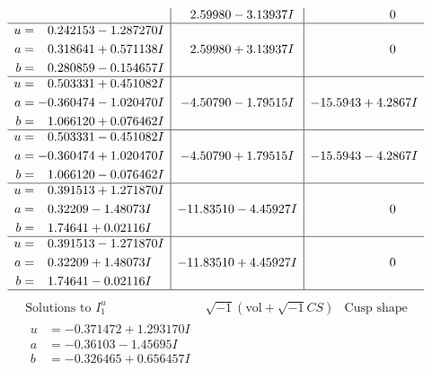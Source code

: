\documentclass[1p]{elsarticle_modified}
\theoremstyle{definition}
\newcommand{\I}{\sqrt{-1}}
\begin{document}
$$\begin{array}{c|c|c}
 & \phantom{-}2.59980 - 3.13937 I & \phantom{-0.000000 } 0 \\ \hline\begin{aligned}
u &= \phantom{-}0.242153 - 1.287270 I \\
a &= \phantom{-}0.318641 + 0.571138 I \\
b &= \phantom{-}0.280859 - 0.154657 I\end{aligned}
 & \phantom{-}2.59980 + 3.13937 I & \phantom{-0.000000 } 0 \\ \hline\begin{aligned}
u &= \phantom{-}0.503331 + 0.451082 I \\
a &= -0.360474 - 1.020470 I \\
b &= \phantom{-}1.066120 + 0.076462 I\end{aligned}
 & -4.50790 - 1.79515 I & -15.5943 + 4.2867 I \\ \hline\begin{aligned}
u &= \phantom{-}0.503331 - 0.451082 I \\
a &= -0.360474 + 1.020470 I \\
b &= \phantom{-}1.066120 - 0.076462 I\end{aligned}
 & -4.50790 + 1.79515 I & -15.5943 - 4.2867 I \\ \hline\begin{aligned}
u &= \phantom{-}0.391513 + 1.271870 I \\
a &= \phantom{-}0.32209 - 1.48073 I \\
b &= \phantom{-}1.74641 + 0.02116 I\end{aligned}
 & -11.83510 - 4.45927 I & \phantom{-0.000000 } 0 \\ \hline\begin{aligned}
u &= \phantom{-}0.391513 - 1.271870 I \\
a &= \phantom{-}0.32209 + 1.48073 I \\
b &= \phantom{-}1.74641 - 0.02116 I\end{aligned}
 & -11.83510 + 4.45927 I & \phantom{-0.000000 } 0\\
 \hline 
 \end{array}$$\newpage$$\begin{array}{c|c|c}  
\text{Solutions to }I^u_{1}& \I (\text{vol} + \sqrt{-1}CS) & \text{Cusp shape}\\
 \hline 
\begin{aligned}
u &= -0.371472 + 1.293170 I \\
a &= -0.36103 - 1.45695 I \\
b &= -0.326465 + 0.656457 I\end{aligned}

\end{array}$$
\end{document}
